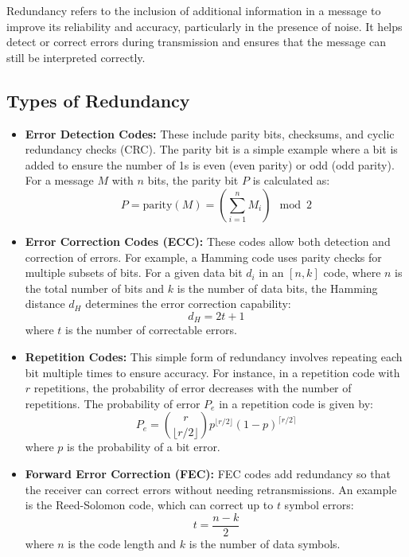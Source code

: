 \documentclass{article}
\begin{document}
Redundancy refers to the inclusion of additional information in a message to improve its reliability and accuracy, particularly in the presence of noise. It helps detect or correct errors during transmission and ensures that the message can still be interpreted correctly.

\subsection{Types of Redundancy}

\begin{itemize}
    \item \textbf{Error Detection Codes:} These include parity bits, checksums, and cyclic redundancy checks (CRC). The parity bit is a simple example where a bit is added to ensure the number of 1s is even (even parity) or odd (odd parity). For a message $M$ with $n$ bits, the parity bit $P$ is calculated as:
    \[
    P = \text{parity}(M) = \left( \sum_{i=1}^{n} M_i \right) \mod 2
    \]
    
    \item \textbf{Error Correction Codes (ECC):} These codes allow both detection and correction of errors. For example, a Hamming code uses parity checks for multiple subsets of bits. For a given data bit $d_i$ in an $[n, k]$ code, where $n$ is the total number of bits and $k$ is the number of data bits, the Hamming distance $d_H$ determines the error correction capability:
    \[
    d_H = 2t + 1
    \]
    where $t$ is the number of correctable errors.
    
    \item \textbf{Repetition Codes:} This simple form of redundancy involves repeating each bit multiple times to ensure accuracy. For instance, in a repetition code with $r$ repetitions, the probability of error decreases with the number of repetitions. The probability of error $P_e$ in a repetition code is given by:
    \[
    P_e = \binom{r}{\lfloor r/2 \rfloor} p^{\lfloor r/2 \rfloor} (1-p)^{\lceil r/2 \rceil}
    \]
    where $p$ is the probability of a bit error.
    
    \item \textbf{Forward Error Correction (FEC):} FEC codes add redundancy so that the receiver can correct errors without needing retransmissions. An example is the Reed-Solomon code, which can correct up to $t$ symbol errors:
    \[
    t = \frac{n - k}{2}
    \]
    where $n$ is the code length and $k$ is the number of data symbols.
    

\end{itemize}
\end{document}

